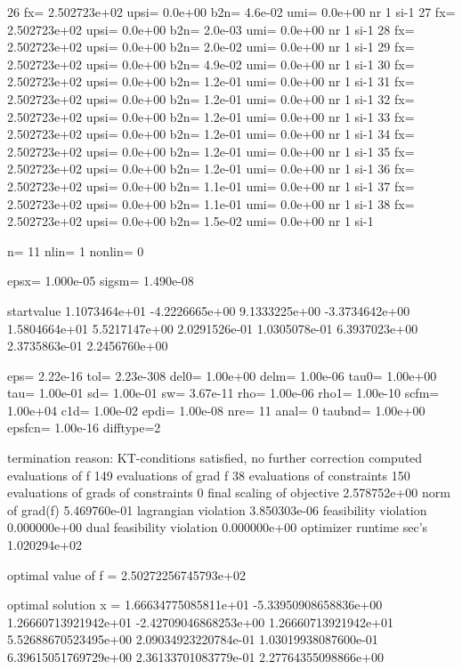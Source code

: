 \documentclass[article]{jss}
\begin{document}
\begin{Schunk}
\begin{Soutput}
   26 fx=   2.502723e+02 upsi=  0.0e+00 b2n=  4.6e-02 umi=  0.0e+00 nr   1 si-1
   27 fx=   2.502723e+02 upsi=  0.0e+00 b2n=  2.0e-03 umi=  0.0e+00 nr   1 si-1
   28 fx=   2.502723e+02 upsi=  0.0e+00 b2n=  2.0e-02 umi=  0.0e+00 nr   1 si-1
   29 fx=   2.502723e+02 upsi=  0.0e+00 b2n=  4.9e-02 umi=  0.0e+00 nr   1 si-1
   30 fx=   2.502723e+02 upsi=  0.0e+00 b2n=  1.2e-01 umi=  0.0e+00 nr   1 si-1
   31 fx=   2.502723e+02 upsi=  0.0e+00 b2n=  1.2e-01 umi=  0.0e+00 nr   1 si-1
   32 fx=   2.502723e+02 upsi=  0.0e+00 b2n=  1.2e-01 umi=  0.0e+00 nr   1 si-1
   33 fx=   2.502723e+02 upsi=  0.0e+00 b2n=  1.2e-01 umi=  0.0e+00 nr   1 si-1
   34 fx=   2.502723e+02 upsi=  0.0e+00 b2n=  1.2e-01 umi=  0.0e+00 nr   1 si-1
   35 fx=   2.502723e+02 upsi=  0.0e+00 b2n=  1.2e-01 umi=  0.0e+00 nr   1 si-1
   36 fx=   2.502723e+02 upsi=  0.0e+00 b2n=  1.1e-01 umi=  0.0e+00 nr   1 si-1
   37 fx=   2.502723e+02 upsi=  0.0e+00 b2n=  1.1e-01 umi=  0.0e+00 nr   1 si-1
   38 fx=   2.502723e+02 upsi=  0.0e+00 b2n=  1.5e-02 umi=  0.0e+00 nr   1 si-1


     n=        11    nlin=         1    nonlin=         0

  epsx= 1.000e-05 sigsm= 1.490e-08

startvalue
  1.1073464e+01  -4.2226665e+00   9.1333225e+00  -3.3734642e+00   1.5804664e+01 
  5.5217147e+00   2.0291526e-01   1.0305078e-01   6.3937023e+00   2.3735863e-01 
  2.2456760e+00 

  eps=  2.22e-16  tol= 2.23e-308 del0=  1.00e+00 delm=  1.00e-06 tau0=  1.00e+00
  tau=  1.00e-01   sd=  1.00e-01   sw=  3.67e-11  rho=  1.00e-06 rho1=  1.00e-10
 scfm=  1.00e+04  c1d=  1.00e-02 epdi=  1.00e-08
  nre=        11 anal=         0
taubnd=  1.00e+00 epsfcn=  1.00e-16 difftype=2

 termination reason:
 KT-conditions satisfied, no further correction computed
 evaluations of f                          149
 evaluations of grad f                      38
 evaluations of constraints                150
 evaluations of grads of constraints         0
 final scaling of objective           2.578752e+00
 norm of grad(f)                      5.469760e-01
 lagrangian violation                 3.850303e-06
 feasibility violation                0.000000e+00
 dual feasibility violation           0.000000e+00
 optimizer runtime sec's              1.020294e+02


 optimal value of f =   2.50272256745793e+02

 optimal solution  x =
  1.66634775085811e+01 -5.33950908658836e+00  1.26660713921942e+01
 -2.42709046868253e+00  1.26660713921942e+01  5.52688670523495e+00
  2.09034923220784e-01  1.03019938087600e-01  6.39615051769729e+00
  2.36133701083779e-01  2.27764355098866e+00


\end{Soutput}
\end{Schunk}
\end{document}
